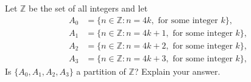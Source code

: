 \documentclass[12pt,letterpaper, onecolumn]{exam}
\begin{document}
\begin{questions}
\begin{solution}
	\end{solution}
	\setcounter{question}{29}\question Let $\mathbb{Z}$ be the set of all integers and let
	\begin{align*}
		A_0&=\{n\in\mathbb{Z}:n=4k, \text{ for some integer }k\},\\
		A_1&=\{n\in\mathbb{Z}:n=4k+1, \text{ for some integer }k\},\\
		A_2&=\{n\in\mathbb{Z}:n=4k+2, \text{ for some integer }k\},\\
		A_3&=\{n\in\mathbb{Z}:n=4k+3, \text{ for some integer }k\},
	\end{align*}
	Is $\{A_0,A_1,A_2,A_3\}$ a partition of $\mathbb{Z}$? Explain your answer.
	\end{questions}
	
\end{document}
